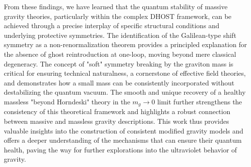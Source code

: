 \documentclass[twocolumn]{aastex631}
\begin{document}
From these findings, we have learned that the quantum stability of massive gravity theories, particularly within the complex DHOST framework, can be achieved through a precise interplay of specific structural conditions and underlying protective symmetries. The identification of the Galilean-type shift symmetry as a non-renormalization theorem provides a principled explanation for the absence of ghost reintroduction at one-loop, moving beyond mere classical degeneracy. The concept of "soft" symmetry breaking by the graviton mass is critical for ensuring technical naturalness, a cornerstone of effective field theories, and demonstrates how a small mass can be consistently incorporated without destabilizing the quantum vacuum. The smooth and unique recovery of a healthy massless "beyond Horndeski" theory in the $m_g \to 0$ limit further strengthens the consistency of this theoretical framework and highlights a robust connection between massive and massless gravity descriptions. This work thus provides valuable insights into the construction of consistent modified gravity models and offers a deeper understanding of the mechanisms that can ensure their quantum health, paving the way for further explorations into the ultraviolet behavior of gravity.

{}

\end{document}

